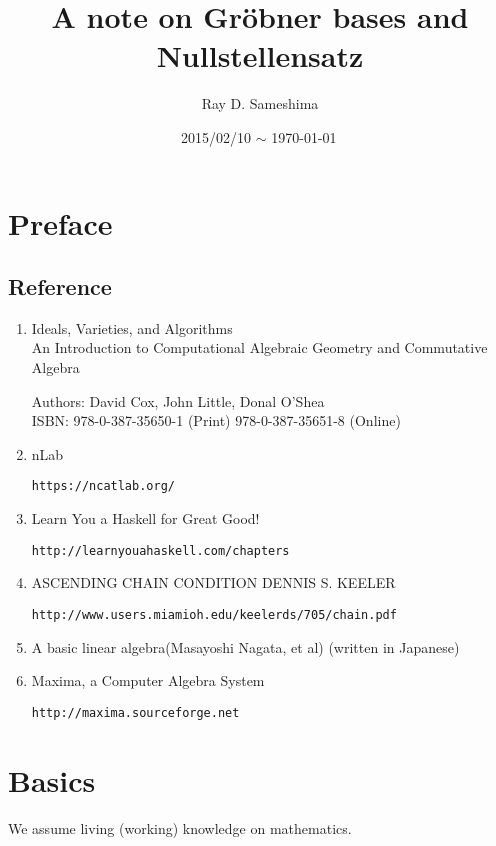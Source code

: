 \documentclass[11pt]{book}
\begin{document}
\newcommand{\Slash}[1]{{\ooalign{\hfil/\crcr$#1$}}}

\title{ A note on Gr\"obner bases and Nullstellensatz}
\author{Ray D. Sameshima}
\date{2015/02/10 $\sim$ \today \, \currenttime}
\maketitle

\tableofcontents

\setcounter{chapter}{-2}
\chapter{Preface}

\section{Reference}
\begin{enumerate}
\item Ideals, Varieties, and Algorithms\\
An Introduction to Computational Algebraic Geometry and Commutative Algebra

Authors: David Cox, John Little, Donal O'Shea\\
ISBN: 978-0-387-35650-1 (Print) 978-0-387-35651-8 (Online)

\item nLab

\verb|https://ncatlab.org/|

\item Learn You a Haskell for Great Good!

\verb|http://learnyouahaskell.com/chapters|

\item ASCENDING CHAIN CONDITION
DENNIS S. KEELER

\verb|http://www.users.miamioh.edu/keelerds/705/chain.pdf|

\item A basic linear algebra(Masayoshi Nagata, et al) (written in Japanese)

\item Maxima, a Computer Algebra System

\verb|http://maxima.sourceforge.net|

\end{enumerate}

\chapter{Basics}
We assume living (working) knowledge on mathematics.
\end{document}
